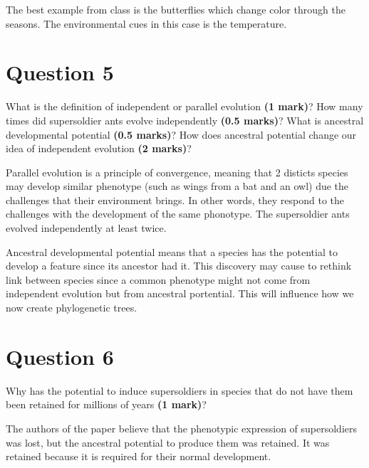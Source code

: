 \documentclass[letterpaper,12pt]{article}
\newenvironment{myindentpar}[1]%
{\begin{list}{}%
          {\setlength{\leftmargin}{#1}}%
          \item[]%
}
{\end{list}}
\begin{document}
\begin{myindentpar}{0.5cm}
The best example from class is the butterflies which change color through the seasons. The environmental cues in this case is the temperature.
\end{myindentpar}



\section*{Question 5}

What is the definition of independent or parallel evolution \textbf{(1 mark)}? How many times did supersoldier ants evolve independently \textbf{(0.5 marks)}? What is ancestral developmental potential \textbf{(0.5 marks)}? How does ancestral potential change our idea of independent evolution \textbf{(2 marks)}?
\vspace*{10px}

\begin{myindentpar}{0.5cm}
Parallel evolution is a principle of convergence, meaning that 2 disticts species may develop similar phenotype (such as wings from a bat and an owl) due the challenges that their environment brings. In other words, they respond to the challenges with the development of the same phonotype. The supersoldier ants evolved independently at least twice.

Ancestral developmental potential means that a species has the potential to develop a feature since its ancestor had it. This discovery may cause to rethink link between species since a common phenotype might not come from independent evolution but from ancestral portential. This will influence how we now create phylogenetic trees.
\end{myindentpar}


\section*{Question 6}

Why has the potential to induce supersoldiers in species that do not have them been retained for millions of years \textbf{(1 mark)}?
\vspace*{10px}

\begin{myindentpar}{0.5cm}
The authors of the paper believe that the phenotypic expression of supersoldiers was lost, but the ancestral potential to produce them was retained. It was retained because it is required for their normal development.
\end{myindentpar}
\end{document}
